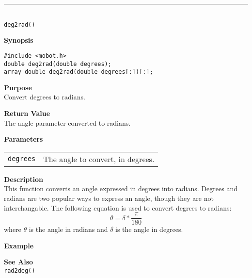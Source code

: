 \noindent
\vspace{5pt}
\rule{4.5in}{0.015in}\\
\noindent
{\LARGE \texttt{deg2rad()}}\\
{}

\noindent
{\bf Synopsis}
\vspace{-8pt}
\begin{verbatim}
#include <mobot.h>
double deg2rad(double degrees);
array double deg2rad(double degrees[:])[:];
\end{verbatim}

\noindent
{\bf Purpose}\\
Convert degrees to radians.

\noindent
{\bf Return Value}\\
The angle parameter converted to radians.

\noindent
{\bf Parameters}
\vspace{-0.1in}
\begin{description}
\item               
\begin{tabular}{p{10 mm}p{145 mm}}
\texttt{degrees} & The angle to convert, in degrees. \\
\end{tabular}
\end{description}

\noindent
{\bf Description}\\
This function converts an angle expressed in degrees into radians. Degrees and
radians are two popular ways to express an angle, though they are not interchangable.
The following equation is used to convert degrees to radians:
\begin{equation*}
\theta = \delta * \frac{\pi}{180}
\end{equation*}
where $\theta$ is the angle in radians and $\delta$ is the angle in degrees.

\noindent
{\bf Example}\\
\noindent

\noindent
{\bf See Also}\\
\texttt{rad2deg()}

